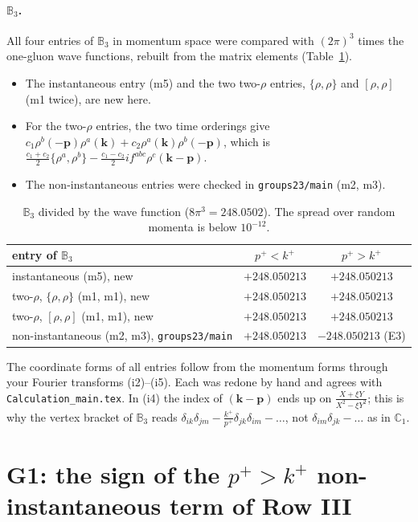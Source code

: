 \documentclass[10pt]{article}
\numberwithin{equation}{section}
\def\mf#1{\mathbb{#1}}
\newcommand{\bk}{\mathbf k}
\newcommand{\bp}{\mathbf p}
\begin{document}
\paragraph{$\mf B_3$.} All four entries of $\mf B_3$ in momentum space were compared with $(2\pi)^3$ times the one-gluon wave functions, rebuilt from the matrix elements (Table~\ref{tab:B3}).
\begin{itemize}
\item The instantaneous entry (m5) and the two two-$\rho$ entries, $\{\rho,\rho\}$ and $[\rho,\rho]$ (m1 twice), are new here.
\item For the two-$\rho$ entries, the two time orderings give $c_1\rho^b(-\bp)\rho^a(\bk)+c_2\rho^a(\bk)\rho^b(-\bp)$, which is $\frac{c_1+c_2}{2}\{\rho^a,\rho^b\}-\frac{c_1-c_2}{2}if^{abc}\rho^c(\bk-\bp)$.
\item The non-instantaneous entries were checked in \texttt{groups23/main} (m2, m3).
\end{itemize}
\begin{table}[H]\centering\small
\begin{tabular}{@{}lcc@{}}\toprule
entry of $\mf B_3$ & $p^+<k^+$ & $p^+>k^+$\\\midrule
instantaneous (m5), new & $+248.050213$ & $+248.050213$\\
two-$\rho$, $\{\rho,\rho\}$ (m1, m1), new & $+248.050213$ & $+248.050213$\\
two-$\rho$, $[\rho,\rho]$ (m1, m1), new & $+248.050213$ & $+248.050213$\\
non-instantaneous (m2, m3), \texttt{groups23/main} & $+248.050213$ & $\mathbf{-248.050213}$ (E3)\\
\bottomrule\end{tabular}
\caption{$\mf B_3$ divided by the wave function ($8\pi^3=248.0502$). The spread over random momenta is below $10^{-12}$.}\label{tab:B3}
\end{table}
The coordinate forms of all entries follow from the momentum forms through your Fourier transforms (i2)--(i5). Each was redone by hand and agrees with \texttt{Calculation\_main.tex}. In (i4) the index of $(\bk-\bp)$ ends up on $\frac{X+\xi Y}{X^2-\xi Y^2}$; this is why the vertex bracket of $\mf B_3$ reads $\delta_{ik}\delta_{jm}-\frac{k^+}{p^+}\delta_{jk}\delta_{im}-\dots$, not $\delta_{im}\delta_{jk}-\dots$ as in $\mf C_1$.

\section{G1: the sign of the \texorpdfstring{$p^+>k^+$}{p+>k+} non-instantaneous term of Row III}\label{sec:G1}
\end{document}
